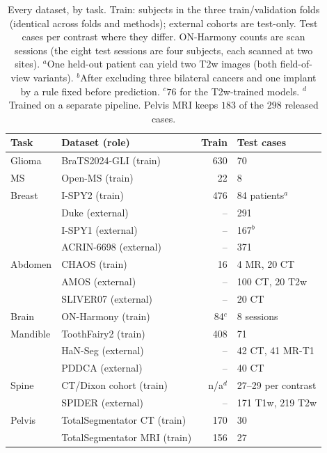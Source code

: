 \begin{table}[h]
\centering
\footnotesize
\setlength{\tabcolsep}{3pt}
\begin{tabular}{@{}llrl@{}}
\toprule
Task & Dataset (role) & Train & Test cases \\
\midrule
Glioma   & BraTS2024-GLI (train)      & 630  & 70 \\
MS       & Open-MS (train)            & 22   & 8 \\
Breast   & I-SPY2 (train)             & 476  & 84 patients$^a$ \\
         & Duke (external)            & --   & 291 \\
         & I-SPY1 (external)          & --   & 167$^b$ \\
         & ACRIN-6698 (external)      & --   & 371 \\
Abdomen  & CHAOS (train)              & 16   & 4 MR, 20 CT \\
         & AMOS (external)            & --   & 100 CT, 20 T2w \\
         & SLIVER07 (external)        & --   & 20 CT \\
Brain    & ON-Harmony (train)         & 84$^c$ & 8 sessions \\
Mandible & ToothFairy2 (train)        & 408  & 71 \\
         & HaN-Seg (external)         & --   & 42 CT, 41 MR-T1 \\
         & PDDCA (external)           & --   & 40 CT \\
Spine    & CT/Dixon cohort (train)    & n/a$^d$ & 27--29 per contrast \\
         & SPIDER (external)          & --   & 171 T1w, 219 T2w \\
Pelvis   & TotalSegmentator CT (train)  & 170 & 30 \\
         & TotalSegmentator MRI (train) & 156 & 27 \\
\bottomrule
\end{tabular}
\caption{Every dataset, by task. Train: subjects in the three train/validation
folds (identical across folds and methods); external cohorts are test-only.
Test cases per contrast where they differ. ON-Harmony counts are scan sessions
(the eight test sessions are four subjects, each scanned at two sites).
$^a$One held-out patient can yield two T2w images (both field-of-view variants).
$^b$After excluding three bilateral cancers and one implant by a rule fixed
before prediction. $^c$$76$ for the T2w-trained models. $^d$Trained on a
separate pipeline. Pelvis MRI keeps $183$ of the $298$ released cases.}
\label{tab:suppl-datasets}
\end{table}
